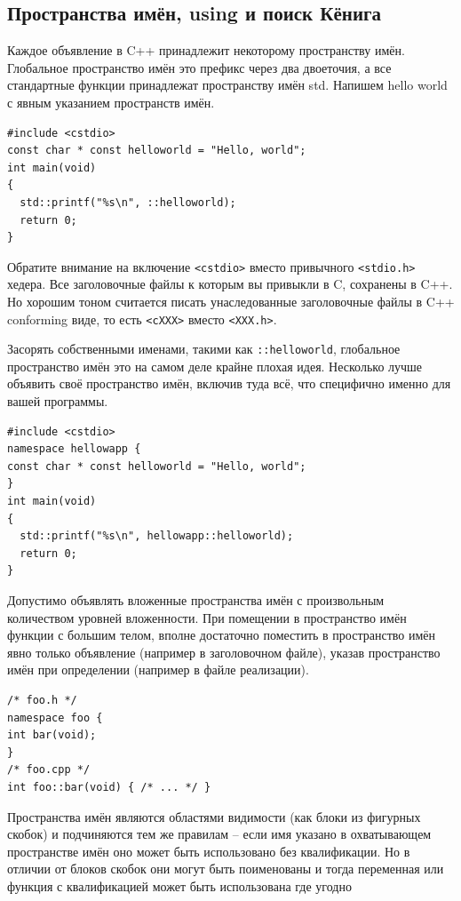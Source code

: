 \documentclass[a4paper,12pt,oneside]{article}
\begin{document}
\subsection{Пространства имён, using и поиск Кёнига}

Каждое объявление в C++ принадлежит некоторому пространству имён. Глобальное пространство имён это префикс через два двоеточия, а все стандартные функции принадлежат пространству имён std. Напишем hello world с явным указанием пространств имён.

\begin{lstlisting}
#include <cstdio>
const char * const helloworld = "Hello, world";
int main(void)
{
  std::printf("%s\n", ::helloworld);
  return 0;
}
\end{lstlisting}

Обратите внимание на включение \lstinline!<cstdio>! вместо привычного \lstinline!<stdio.h>! хедера. Все заголовочные файлы к которым вы привыкли в C, сохранены в C++. Но хорошим тоном считается писать унаследованные заголовочные файлы в C++ conforming виде, то есть \lstinline!<cXXX>! вместо \lstinline!<XXX.h>!.

Засорять собственными именами, такими как \lstinline!::helloworld!, глобальное пространство имён это на самом деле крайне плохая идея. Несколько лучше объявить своё пространство имён, включив туда всё, что специфично именно для вашей программы.

\begin{lstlisting}
#include <cstdio>
namespace hellowapp {
const char * const helloworld = "Hello, world";
}
int main(void)
{
  std::printf("%s\n", hellowapp::helloworld);
  return 0;
}
\end{lstlisting}

Допустимо объявлять вложенные пространства имён с произвольным количеством уровней вложенности. При помещении в пространство имён функции с большим телом, вполне достаточно поместить в пространство имён явно только объявление (например в заголовочном файле), указав пространство имён при определении (например в файле реализации).

\begin{lstlisting}
/* foo.h */
namespace foo {
int bar(void);
}
/* foo.cpp */
int foo::bar(void) { /* ... */ }
\end{lstlisting}

Пространства имён являются областями видимости (как блоки из фигурных скобок) и подчиняются тем же правилам – если имя указано в охватывающем пространстве имён оно может быть использовано без квалификации. Но в отличии от блоков скобок они могут быть поименованы и тогда переменная или функция с квалификацией может быть использована где угодно
\end{document}
